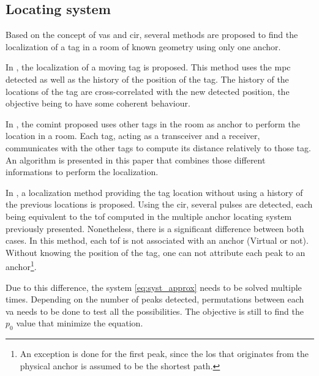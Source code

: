 \subsection{Locating system}

Based on the concept of \gls{vas} and \gls{cir}, several methods are proposed to find the localization of a tag in a room of known geometry using only one anchor.
\vspace{2mm}

In \cite{meissner2010mc}, the localization of a moving tag is proposed. This method uses the \gls{mpc} detected as well as the history of the position of the tag. The history of the locations of the tag are cross-correlated with the new detected position, the objective being to have some coherent behaviour.
\vspace{2mm}

In \cite{froehle2013cooperative}, the \gls{comint} proposed uses other tags in the room as anchor to perform the location in a room. Each tag, acting as a transceiver and a receiver, communicates with the other tags to compute its distance relatively to those tag. An algorithm is presented in this paper that combines those different informations to perform the localization.
\vspace{2mm}

In \cite{jespersen2018indoor}, a localization method providing the tag location without using a history of the previous locations is proposed. Using the \gls{cir}, several pulses are detected, each being equivalent to the \gls{tof} computed in the multiple anchor locating system previously presented. Nonetheless, there is a significant difference between both cases. In this method, each \gls{tof} is not associated with an anchor (Virtual or not). Without knowing the position of the tag, one can not attribute each peak to an anchor\footnote{An exception is done for the first peak, since the \gls{los} that originates from the physical anchor is assumed to be the shortest path.}.
\vspace{2mm}

Due to this difference, the system \ref{eq:syst_approx} needs to be solved multiple times. Depending on the number of peaks detected, permutations between each \gls{va} needs to be done to test all the possibilities. The objective is still to find the $p_0$ value that minimize the equation.




